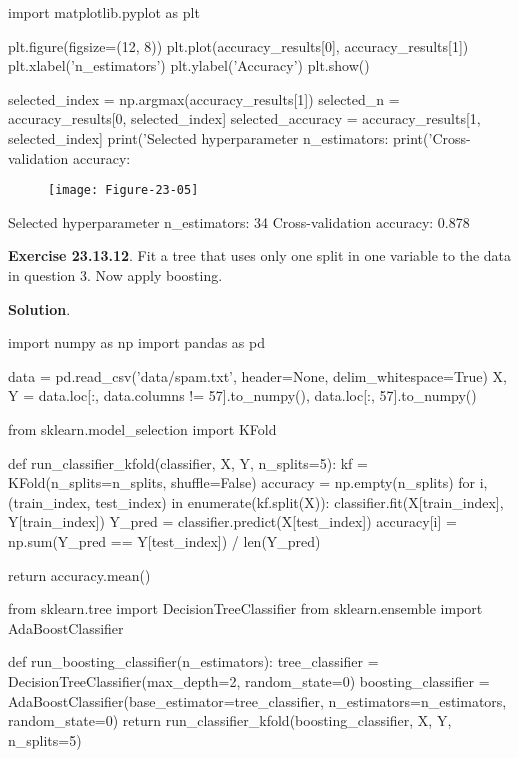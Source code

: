 \begin{python}
import matplotlib.pyplot as plt

plt.figure(figsize=(12, 8))
plt.plot(accuracy_results[0], accuracy_results[1])
plt.xlabel('n_estimators')
plt.ylabel('Accuracy')
plt.show()

selected_index = np.argmax(accuracy_results[1])
selected_n = accuracy_results[0, selected_index]
selected_accuracy = accuracy_results[1, selected_index]
print('Selected hyperparameter n_estimators: %
print('Cross-validation accuracy: %
\end{python}

\begin{figure}[H]
\texttt{[image: Figure-23-05]}
\end{figure}

\begin{console}
Selected hyperparameter n\_estimators: 34
Cross-validation accuracy: 0.878
\end{console}

\textbf{Exercise 23.13.12}. Fit a tree that uses only one split in one
variable to the data in question 3. Now apply boosting.

\textbf{Solution}.

\begin{python}
import numpy as np
import pandas as pd

data = pd.read_csv('data/spam.txt', header=None, delim_whitespace=True)
X, Y = data.loc[:, data.columns != 57].to_numpy(), data.loc[:, 57].to_numpy()
\end{python}

\begin{python}
from sklearn.model_selection import KFold

def run_classifier_kfold(classifier, X, Y, n_splits=5):
    kf = KFold(n_splits=n_splits, shuffle=False)
    accuracy = np.empty(n_splits)
    for i, (train_index, test_index) in enumerate(kf.split(X)):
        classifier.fit(X[train_index], Y[train_index])
        Y_pred = classifier.predict(X[test_index])
        accuracy[i] = np.sum(Y_pred == Y[test_index]) / len(Y_pred)
    
    return accuracy.mean()
\end{python}

\begin{python}
from sklearn.tree import DecisionTreeClassifier
from sklearn.ensemble import AdaBoostClassifier

def run_boosting_classifier(n_estimators):
    tree_classifier = DecisionTreeClassifier(max_depth=2, random_state=0)
    boosting_classifier = AdaBoostClassifier(base_estimator=tree_classifier, n_estimators=n_estimators, random_state=0)
    return run_classifier_kfold(boosting_classifier, X, Y, n_splits=5)
\end{python}

